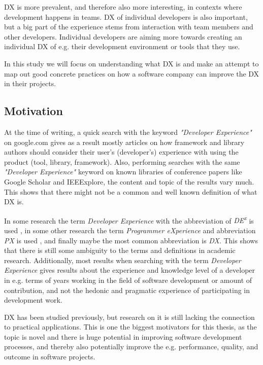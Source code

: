 \documentclass[english, 12pt, a4paper, sci, utf8, a-1b, online]{aaltothesis}
\begin{document}
DX is more prevalent, and therefore also more interesting, in contexts where development happens in teams. DX of individual developers is also important, but a big part of the experience stems from interaction with team members and other developers. Individual developers are aiming more towards creating an individual DX of e.g. their development environment or tools that they use.

In this study we will focus on understanding what DX is and make an attempt to map out good concrete practices on how a software company can improve the DX in their projects.

\thispagestyle{empty}

\subsection{Motivation} \label{motivation}

At the time of writing, a quick search with the keyword \textit{"Developer Experience"} on google.com gives as a result mostly articles on how framework and library authors should consider their user's (developer's) experience with using the product (tool, library, framework). Also, performing searches with the same \textit{"Developer Experience"} keyword on known libraries of conference papers like Google Scholar and IEEExplore, the content and topic of the results vary much. This shows that there might not be a common and well known definition of what DX is.

In some research the term \textit{Developer Experience} with the abbreviation of \textit{DE\textsuperscript{x}} is used \citep{fagerholm-dx-concept-and-definition}, in some other research the term \textit{Programmer eXperience} and abbreviation \textit{PX} is used \citep{programmer-experience}, and finally maybe the most common abbreviation is \textit{DX}. This shows that there is still some ambiguity to the terms and definitions in academic research. Additionally, most results when searching with the term \textit{Developer Experience} gives results about the experience and knowledge level of a developer in e.g. terms of years working in the field of software development or amount of contribution, and not the hedonic and pragmatic experience of participating in development work.

DX has been studied previously, but research on it is still lacking the connection to practical applications. This is one the biggest motivators for this thesis, as the topic is novel and there is huge potential in improving software development processes, and thereby also potentially improve the e.g. performance, quality, and outcome in software projects.
\end{document}
